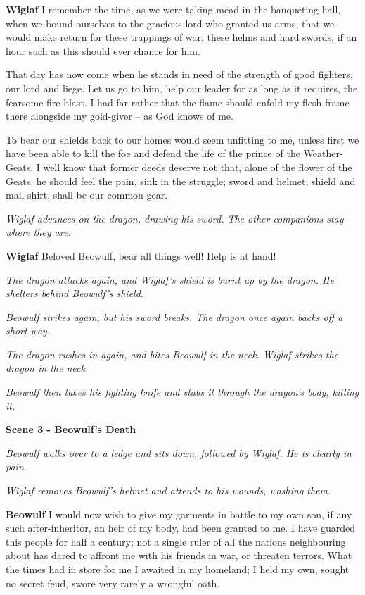 \documentclass[a4paper]{article}
\begin{document}
{\textbf{Wiglaf} I remember the time, as we were taking mead
in the banqueting hall, when we bound ourselves
to the gracious lord who granted us arms,
that we would make return for these trappings of war,
these helms and hard swords, if an hour such as this
should ever chance for him. 

That day has now come
when he stands in need of the strength of good fighters,
our lord and liege. Let us go to him,
help our leader for as long as it requires,
the fearsome fire-blast. I had far rather
that the flame should enfold my flesh-frame there
alongside my gold-giver – as God knows of me.

To bear our shields back to our homes
would seem unfitting to me, unless first we have been able
to kill the foe and defend the life
of the prince of the Weather-Geats. I well know
that former deeds deserve not that, alone
of the flower of the Geats, he should feel the pain,
sink in the struggle; sword and helmet,
shield and mail-shirt, shall be our common gear.

\newpage
\centerline{\textit{Wiglaf advances on the dragon, drawing his sword. The other companions stay where they are.}}

\textbf{Wiglaf} 
Beloved Beowulf, bear all things well!
Help is at hand!

\centerline{\textit{The dragon attacks again, and Wiglaf's shield is burnt up by the dragon. He shelters behind Beowulf's shield.}}
\centerline{\textit{Beowulf strikes again, but his sword breaks. The dragon once again backs off a short way.}}

\centerline{\textit{The dragon rushes in again, and bites Beowulf in the neck. Wiglaf strikes the dragon in the neck.}}
\centerline{\textit{Beowulf then takes his fighting knife and stabs it through the dragon's body, killing it.}}

\newpage
\centerline{\textbf{Scene 3 - Beowulf's Death}}
\centerline{\textit{Beowulf walks over to a ledge and sits down, followed by Wiglaf. He is clearly in pain.}}
\centerline{\textit{Wiglaf removes Beowulf's helmet and attends to his wounds, washing them.}}

\textbf{Beowulf} I would now wish to give my garments in battle
to my own son, if any such
after-inheritor, an heir of my body,
had been granted to me. I have guarded this people
for half a century; not a single ruler
of all the nations neighbouring about
has dared to affront me with his friends in war,
or threaten terrors. What the times had in store for me
I awaited in my homeland; I held my own,
sought no secret feud, swore very rarely
a wrongful oath.

}
\end{document}
